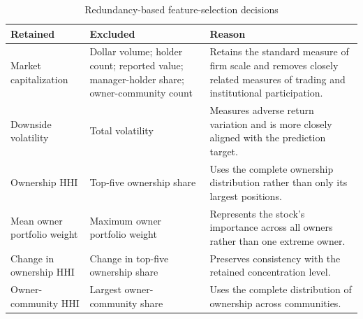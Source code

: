 \begin{table}[H]
        \centering
        \footnotesize
        \caption{Redundancy-based feature-selection decisions}
        \label{tab:correlation-feature-selection}
        \begin{tabular}{>{\raggedright\arraybackslash}p{}>{\raggedright\arraybackslash}p{}>{\raggedright\arraybackslash}p{}}
                \toprule
                Retained & Excluded                                                                                                                    & Reason \\
                \midrule
                Market capitalization
                         & Dollar volume; holder count; reported value; manager-holder share; owner-community count
                         & Retains the standard measure of firm scale and removes closely related measures of trading and institutional participation.          \\
                Downside volatility
                         & Total volatility
                         & Measures adverse return variation and is more closely aligned with the prediction target.                                            \\
                Ownership HHI
                         & Top-five ownership share
                         & Uses the complete ownership distribution rather than only its largest positions.                                                     \\
                Mean owner portfolio weight
                         & Maximum owner portfolio weight
                         & Represents the stock's importance across all owners rather than one extreme owner.                                                   \\
                Change in ownership HHI
                         & Change in top-five ownership share
                         & Preserves consistency with the retained concentration level.                                                                         \\
                Owner-community HHI
                         & Largest owner-community share
                         & Uses the complete distribution of ownership across communities.                                                                      \\
                \bottomrule
        \end{tabular}
\end{table}

